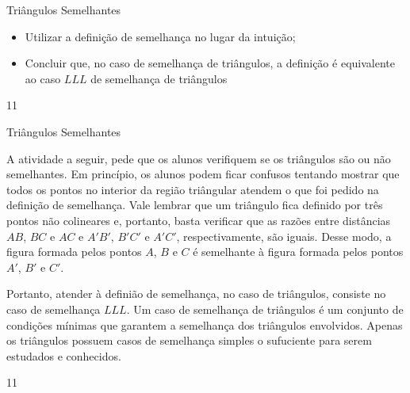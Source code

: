 \def\currentcolor{session1}
\begin{objectives}{Triângulos Semelhantes}
{\begin{itemize}
\item {} 
Utilizar a definição de semelhança no lugar da intuição;

\item {} 
Concluir que, no caso de semelhança de triângulos, a definição é equivalente ao caso $LLL$ de semelhança de triângulos

\end{itemize}}
{1}{1}
\end{objectives}
\marginpar{\vspace{-2.5em}}
\begin{sugestions}{Triângulos Semelhantes}
{A atividade a seguir, pede que os alunos verifiquem se os triângulos são ou não semelhantes. Em princípio, os alunos podem ficar confusos tentando mostrar que todos os pontos no interior da região triângular atendem o que foi pedido na definição de semelhança. Vale lembrar que um triângulo fica definido por três pontos não colineares e, portanto, basta verificar que as razões entre distâncias \(AB\), \(BC\) e \(AC\) e \(A'B'\), \(B'C'\) e \(A'C'\), respectivamente, são iguais. Desse modo, a figura formada pelos pontos \(A\), \(B\) e \(C\) é semelhante à figura formada pelos pontos \(A'\), \(B'\) e \(C'\).

Portanto, atender à definião de semelhança, no caso de triângulos, consiste no caso de semelhança \(LLL\). Um caso de semelhança de triângulos é um conjunto de condições mínimas que garantem a semelhança dos triângulos envolvidos. Apenas os triângulos possuem casos de semelhança simples o sufuciente para serem estudados e conhecidos.}
{1}{1}
\end{sugestions}
\marginpar{\vspace{-1.5em}}
